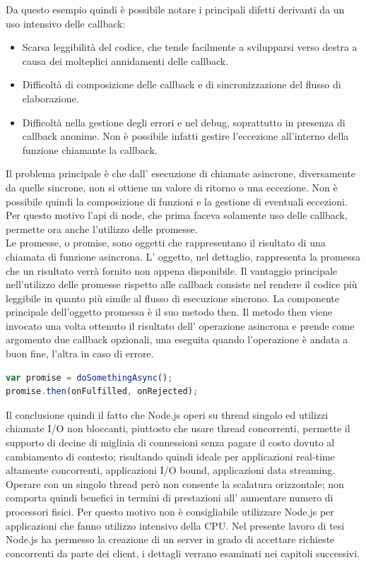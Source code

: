 Da questo esempio quindi è possibile notare i principali difetti derivanti da un uso intensivo delle callback:
\begin{itemize}
\item Scarsa leggibilità del codice, che tende facilmente a svilupparsi verso destra a causa dei molteplici annidamenti delle callback.
\item Difficoltà di composizione delle callback e di sincronizzazione del flusso di elaborazione.
\item Difficoltà nella gestione degli errori e nel debug, soprattutto in presenza di callback anonime. Non è possibile infatti gestire l’eccezione all’interno della funzione chiamante la callback.
\end{itemize}
Il problema principale è che dall’ esecuzione di chiamate asincrone, diversamente da quelle sincrone, non si ottiene un valore di ritorno o una eccezione. Non è possibile quindi la composizione di funzioni e la gestione di eventuali eccezioni.
Per questo motivo l’api di node, che prima faceva solamente uso delle callback, permette ora anche l’utilizzo delle promesse.
\\
Le promesse, o promise, sono oggetti che rappresentano il risultato di una chiamata di funzione asincrona. L’ oggetto, nel dettaglio, rappresenta la promessa che un risultato verrà fornito non appena disponibile.
Il vantaggio principale nell’utilizzo delle promesse rispetto alle callback consiste nel rendere il codice più leggibile in quanto più simile al flusso di esecuzione sincrono.
La componente principale dell’oggetto promessa è il suo metodo then. 
Il metodo then viene invocato una volta ottenuto il risultato dell’ operazione asincrona e prende come argomento due callback opzionali, una eseguita quando l’operazione è andata a buon fine, l’altra in caso di errore.
\begin{lstlisting}[language=JavaScript]
var promise = doSomethingAsync();
promise.then(onFulfilled, onRejected);
\end{lstlisting}
Il conclusione quindi il fatto che Node.js operi su thread singolo ed utilizzi chiamate I/O non bloccanti, piuttosto che usare thread concorrenti, permette il supporto di decine di migliaia di connessioni senza pagare il costo dovuto al cambiamento di contesto; risultando quindi ideale per applicazioni real-time altamente concorrenti, applicazioni I/O bound, applicazioni data streaming. Operare con un singolo thread però non consente la scalatura orizzontale; non comporta quindi benefici in termini di prestazioni all’ aumentare numero di processori fisici. 
Per questo motivo non è consigliabile utilizzare Node.js per applicazioni che fanno utilizzo intensivo della CPU.
Nel presente lavoro di tesi Node.js ha permesso la creazione di un server in grado di accettare richieste concorrenti da parte dei client, i dettagli verrano esaminati nei capitoli successivi.

